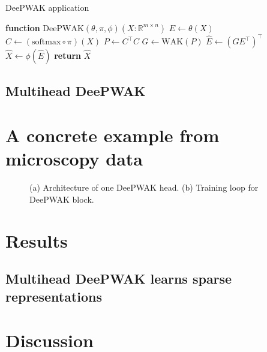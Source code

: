 \documentclass{article}
\begin{document}
\begin{algorithm}
  \caption{DeePWAK application}\label{alg:cap}
  \begin{algorithmic}[1]
    \State \textbf{function} $\mathrm{DeePWAK}(\theta, \pi, \phi)(X : \mathbb{R}^{m \times n})${
    \State $E \gets \theta(X)$
    \State $C \gets (\mathrm{softmax} \circ \pi)(X)$
    \State $P \gets C^\top C$
    \State $G \gets \mathrm{WAK}(P)$
    \State $\hat{E} \gets (GE^\top)^\top$
    \State $\hat{X} \gets \phi(\hat{E})$
    \State \textbf{return} $\hat{X}$
    }
  \end{algorithmic}
\end{algorithm}

\subsection{Multihead DeePWAK}

\section{A concrete example from microscopy data}

\begin{figure}[ht]
     \begin{subfigure}[t]{0.10\textwidth}
        
         \caption{}
         \label{fig:}
     \end{subfigure}

     \hfill
     \begin{subfigure}[t]{0.10\textwidth}
        
         \caption{}
         \label{fig:}
     \end{subfigure}
     
     \vspace{1cm}
     \begin{subfigure}[t]{0.10\textwidth}
        
         \caption{}
         \label{fig:}
     \end{subfigure}

     \hfill
     \begin{subfigure}[t]{0.10\textwidth}
       
       \caption{}
       \label{fig:}
     \end{subfigure}
     
     \caption{(a) Architecture of one DeePWAK head. (b) Training loop for DeePWAK block.}
     \label{fig:}
\end{figure}


\section{Results}

\subsection{Multihead DeePWAK learns sparse representations}

\section{Discussion}

\printbibliography
\end{document}
